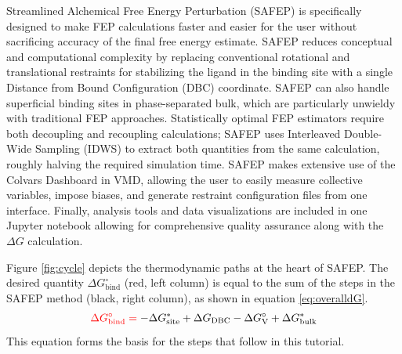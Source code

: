 \documentclass[9pt,tutorial]{Styling/livecoms}
\begin{document}
Streamlined Alchemical Free Energy Perturbation (SAFEP) is specifically designed to make FEP calculations faster and easier for the user without sacrificing accuracy of the final free energy estimate.
SAFEP reduces conceptual and computational complexity by replacing conventional rotational and translational restraints for stabilizing the ligand in the binding site with a single Distance from Bound Configuration (DBC) coordinate.
SAFEP can also handle superficial binding sites in phase-separated bulk\cite{Salari2018}, which are particularly unwieldy with traditional FEP approaches. 
Statistically optimal FEP estimators require both decoupling and recoupling calculations; SAFEP uses Interleaved Double-Wide Sampling (IDWS) to extract both quantities from the same calculation, roughly halving the required simulation time. 
SAFEP makes extensive use of the Colvars Dashboard in VMD, allowing the user to easily measure collective variables, impose biases, and generate restraint configuration files from one interface. 
Finally, analysis tools and data visualizations are included in one Jupyter notebook allowing for comprehensive quality assurance along with the $\Delta G$ calculation.

Figure \ref{fig:cycle} depicts the thermodynamic paths at the heart of SAFEP. 
The desired quantity $\Delta G^\circ_\mathrm{bind}$ (red, left column) is equal to the sum of the steps in the SAFEP method (black, right column), as shown in equation \ref{eq:overalldG}. 
\begin{equation}\label{eq:overalldG}
    \color{red} \Delta G^\circ_\mathrm{bind} = \color{black} - \Delta G_\mathrm{site}^* + \Delta G_\mathrm{DBC} - \Delta G^\circ_\mathrm{V} + \Delta G^*_\mathrm{bulk} 
\end{equation}
\noindent This equation forms the basis for the steps that follow in this tutorial. 
\end{document}
